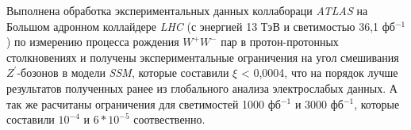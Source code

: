 Выполнена обработка экспериментальных данных коллабораци  \textit{ATLAS} на Большом адронном коллайдере \textit{LHC} (с энергией 13 ТэВ и светимостью 36,1 фб${}^{−1}$) по измерению процесса рождения ${W}^{+}$${W}^{-}$ пар в протон-протонных столкновениях и получены экспериментальные ограничения на угол смешивания ${Z}^{\prime}$-бозонов в модели \textit{SSM}, которые составили $\xi$ < 0,0004, что на порядок лучше результатов полученных ранее из глобального анализа электрослабых данных. А так же расчитаны ограничения для светимостей 1000 фб${}^{−1}$ и 3000 фб${}^{−1}$, которые составили ${10}^{-4}$ и $6*{10}^{-5}$ соотвественно.